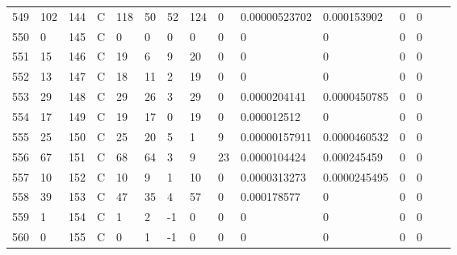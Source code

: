 \begin{longtable}{lllllllllllllll}
	549 & 102               & 144 & C   & 118               & 50                & 52                & 124  & 0          & 0.00000523702  & 0.000153902    & 0             & 0            \\
	550 & 0                 & 145 & C   & 0                 & 0                 & 0                 & 0    & 0          & 0              & 0              & 0             & 0            \\
	551 & 15                & 146 & C   & 19                & 6                 & 9                 & 20   & 0          & 0              & 0              & 0             & 0            \\
	552 & 13                & 147 & C   & 18                & 11                & 2                 & 19   & 0          & 0              & 0              & 0             & 0            \\
	553 & 29                & 148 & C   & 29                & 26                & 3                 & 29   & 0          & 0.0000204141   & 0.0000450785   & 0             & 0            \\
	554 & 17                & 149 & C   & 19                & 17                & 0                 & 19   & 0          & 0.000012512    & 0              & 0             & 0            \\
	555 & 25                & 150 & C   & 25                & 20                & 5                 & 1    & 9          & 0.00000157911  & 0.0000460532   & 0             & 0            \\
	556 & 67                & 151 & C   & 68                & 64                & 3                 & 9    & 23         & 0.0000104424   & 0.000245459    & 0             & 0            \\
	557 & 10                & 152 & C   & 10                & 9                 & 1                 & 10   & 0          & 0.0000313273   & 0.0000245495   & 0             & 0            \\
	558 & 39                & 153 & C   & 47                & 35                & 4                 & 57   & 0          & 0.000178577    & 0              & 0             & 0            \\
	559 & 1                 & 154 & C   & 1                 & 2                 & -1                & 0    & 0          & 0              & 0              & 0             & 0            \\
	560 & 0                 & 155 & C   & 0                 & 1                 & -1                & 0    & 0          & 0              & 0              & 0             & 0            \\

\end{longtable}
